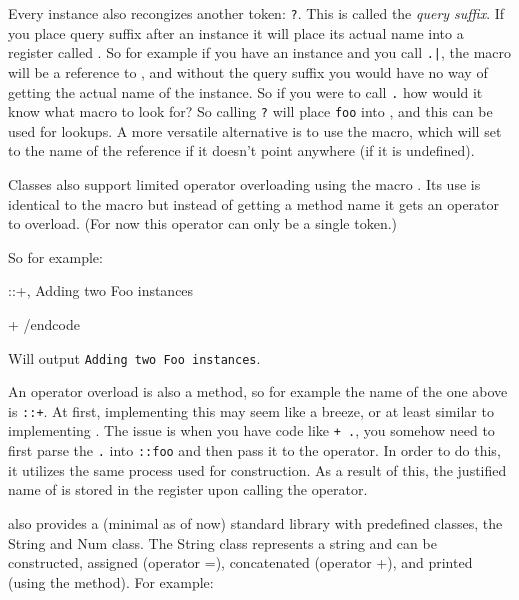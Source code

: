 \beginsscare
Every instance also recongizes another token: {\tt?}.
This is called the {\it query suffix}.
If you place query suffix after an instance it will place its actual name into a register called
{\tt\string\tpp@instance@name}.
So for example if you have an instance {\tt\string\foo} and you call {\tt\string\foo.\string\bar}, the macro
{\tt\string\self} will be a reference to {\tt\string\foo}, and without the query suffix you would have no
way of getting the actual name of the instance.
So if you were to call {\tt\string\self.\string\member} how would it know what macro to look for?
So calling {\tt\string\self?} will place {\tt foo} into {\tt\string\tpp@instance@name}, and this can be used
for lookups.
A more versatile alternative is to use the {\tt\string\@get@instance@name} macro, which will set
{\tt\string\tpp@instance@name} to the name of the reference if it doesn't point anywhere (if it is undefined).
\endscare

Classes also support limited operator overloading using the macro {\tt\string\operator}.
Its use is identical to the {\tt\string\method} macro but instead of getting a method name it gets an operator
to overload.
(For now this operator can only be a single token.)

So for example:

\begincode
\operator\Foo::+{\self,\other}{%
    Adding two Foo instances%
}

\Foo\fooA{}
\Foo\fooB{}

\fooA + \fooB
/endcode

Will output {\tt Adding two Foo instances}.

\beginscare
An operator overload is also a method, so for example the name of the one above is {\tt\string\Foo::+}.
At first, implementing this may seem like a breeze, or at least similar to implementing {\tt\string\method}.
The issue is when you have code like {\tt\string\foo + \string\self.\string\foo}, you somehow need to first parse
the {\tt\string\self.\string\foo} into {\tt\string\instance::foo} and then pass it to the operator.
In order to do this, it utilizes the same process used for construction.
As a result of this, the justified name of {\tt\string\other} is stored in the register
{\tt\string\tpp@instance@name} upon calling the operator.
\endscare

\OoP{} also provides a (minimal as of now) standard library with predefined classes, the String and Num class.
The String class represents a string and can be constructed, assigned (operator =), concatenated (operator +), and
printed (using the {\tt\string\print} method).
For example:

